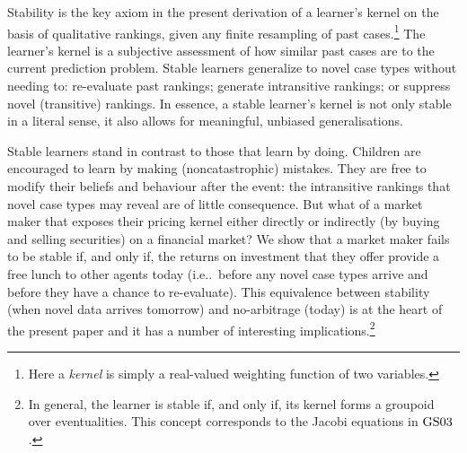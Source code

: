 \documentclass[ecta,nameyear,draft]{econsocart}
\makeatletter
\newcommand\ie{i\@.e\@ifnextchar.{}{.\@}}
\newcommand{\gsii}{$\textup{GS03}$}
\theoremstyle{plain}
\theoremstyle{remark}
\makeatother
\begin{document}
Stability is the key axiom in the present derivation of a learner's kernel on
the basis of qualitative rankings, given any finite resampling of past
cases.\footnote{Here a \emph{kernel} is simply a real-valued weighting function
of two variables.} The learner's kernel is a subjective assessment of how
similar past cases are to the current prediction problem.  Stable learners
generalize to novel case types without needing to: re-evaluate past rankings;
generate intransitive rankings; or suppress novel (transitive) rankings. In
essence, a stable learner's kernel is not only stable in a literal sense, it
also allows for meaningful, unbiased generalisations.
 



Stable learners stand in contrast to those that learn by doing. Children are
encouraged to learn by making (noncatastrophic) mistakes. They are free to
modify their beliefs and behaviour after the event: the intransitive rankings
that novel case types may reveal \citep{weinstein} are of little consequence.
But what of a market maker that exposes their pricing kernel either directly or
indirectly (by buying and selling securities) on a financial market? We show
that a market maker fails to be stable if, and only if, the returns on
investment that they offer provide a free lunch to other agents today (\ie\
before any novel case types arrive and before they have a chance to
re-evaluate).  This equivalence between stability (when novel data arrives
tomorrow) and no-arbitrage (today) is at the heart of the present paper and it
has a number of interesting implications.\footnote{In general, the learner is
  stable if, and only if, its kernel forms a groupoid over eventualities. This
  concept corresponds to the Jacobi equations in \gsii.}
\end{document}
